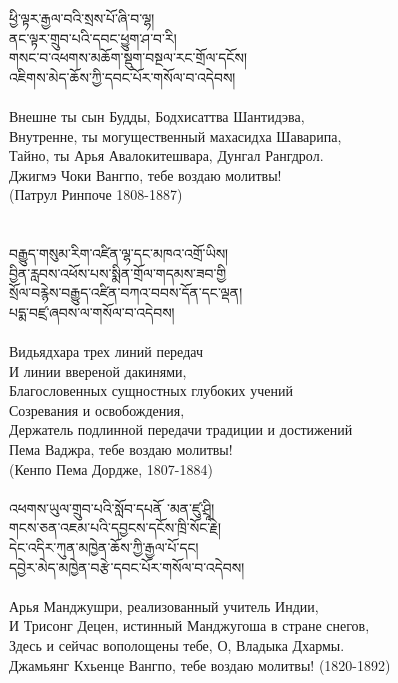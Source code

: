 {\ti ཕྱི་ལྟར་རྒྱལ་བའི་སྲས་པོ་ཞི་བ་ལྷ། \\
ནང་ལྟར་གྲུབ་པའི་དབང་ཕྱུག་ཤ་བ་རི། \\
གསང་བ་འཕགས་མཆོག་སྡུག་བསྔལ་རང་གྲོལ་དངོས། \\
འཇིགས་མེད་ཆོས་ཀྱི་དབང་པོར་གསོལ་བ་འདེབས།}\\
\\
\ru
Внешне ты сын Будды, Бодхисаттва Шантидэва,\\
Внутренне, ты могущественный махасидха Шаварипа,\\
Тайно, ты Арья Авалокитешвара, Дунгал Рангдрол.\\
Джигмэ Чоки Вангпо, тебе воздаю молитвы!\\
\hspace{1cm} (Патрул Ринпоче 1808-1887)\\
\\
\\
{\ti བརྒྱུད་གསུམ་རིག་འཛིན་ལྷ་དང་མཁའ་འགྲོ་ཡིས། \\
བྱིན་རླབས་འཕོས་པས་སྨིན་གྲོལ་གདམས་ཟབ་གྱི \\
སྲོལ་བརྙེས་བརྒྱུད་འཛིན་བཀའ་བབས་དོན་དང་ལྡན། \\
པདྨ་བཛྲ་ཞབས་ལ་གསོལ་བ་འདེབས།}\\
\\
\ru
Видьядхара трех линий передач\\ И линии ввереной дакинями,\\
Благословенных сущностных глубоких учений \\Созревания и освобождения,\\
Держатель подлинной передачи традиции и достижений\\
Пема Ваджра, тебе воздаю молитвы! \\
\hspace{1cm} (Кенпо Пема Дордже, 1807-1884)\\
\\

{\ti འཕགས་ཡུལ་གྲུབ་པའི་སློབ་དཔནོ ་མན་ཛུ་ཤྲཱི། \\
གངས་ཅན་འཇམ་པའི་དབྱངས་དངོས་ཁྲི་སོང་རྗེ། \\
དེང་འདིར་ཀུན་མཁྱེན་ཆོས་ཀྱི་རྒྱལ་པོ་དང། \\
དབྱེར་མེད་མཁྱེན་བརྩེ་དབང་པོར་གསོལ་བ་འདེབས།}\\
\\
\ru
Арья Манджушри, реализованный учитель Индии,\\
И Трисонг Децен, истинный Манджугоша в стране снегов,\\
Здесь и сейчас вополощены тебе, О, Владыка Дхармы. \\
Джамьянг Кхьенце Вангпо, тебе воздаю молитвы! (1820-1892)\\
\\
\newpage

